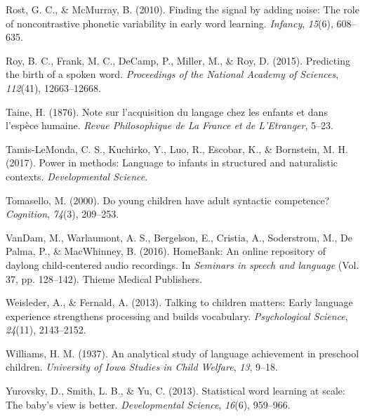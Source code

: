 \documentclass[floatsintext,man]{apa6}
\theoremstyle{definition}
\theoremstyle{definition}
\theoremstyle{definition}
\theoremstyle{remark}
\begin{document}
\leavevmode\hypertarget{ref-rost2010finding}{}%
Rost, G. C., \& McMurray, B. (2010). Finding the signal by adding noise:
The role of noncontrastive phonetic variability in early word learning.
\emph{Infancy}, \emph{15}(6), 608--635.

\leavevmode\hypertarget{ref-roy2015predicting}{}%
Roy, B. C., Frank, M. C., DeCamp, P., Miller, M., \& Roy, D. (2015).
Predicting the birth of a spoken word. \emph{Proceedings of the National
Academy of Sciences}, \emph{112}(41), 12663--12668.

\leavevmode\hypertarget{ref-taine1876note}{}%
Taine, H. (1876). Note sur l'acquisition du langage chez les enfants et
dans l'espèce humaine. \emph{Revue Philosophique de La France et de
L'Etranger}, 5--23.

\leavevmode\hypertarget{ref-tamis2017power}{}%
Tamis-LeMonda, C. S., Kuchirko, Y., Luo, R., Escobar, K., \& Bornstein,
M. H. (2017). Power in methods: Language to infants in structured and
naturalistic contexts. \emph{Developmental Science}.

\leavevmode\hypertarget{ref-tomasello2000young}{}%
Tomasello, M. (2000). Do young children have adult syntactic competence?
\emph{Cognition}, \emph{74}(3), 209--253.

\leavevmode\hypertarget{ref-vandam2016homebank}{}%
VanDam, M., Warlaumont, A. S., Bergelson, E., Cristia, A., Soderstrom,
M., De Palma, P., \& MacWhinney, B. (2016). HomeBank: An online
repository of daylong child-centered audio recordings. In \emph{Seminars
in speech and language} (Vol. 37, pp. 128--142). Thieme Medical
Publishers.

\leavevmode\hypertarget{ref-weisleder2013talking}{}%
Weisleder, A., \& Fernald, A. (2013). Talking to children matters: Early
language experience strengthens processing and builds vocabulary.
\emph{Psychological Science}, \emph{24}(11), 2143--2152.

\leavevmode\hypertarget{ref-williams1937analytical}{}%
Williams, H. M. (1937). An analytical study of language achievement in
preschool children. \emph{University of Iowa Studies in Child Welfare},
\emph{13}, 9--18.

\leavevmode\hypertarget{ref-yurovsky2013statistical}{}%
Yurovsky, D., Smith, L. B., \& Yu, C. (2013). Statistical word learning
at scale: The baby's view is better. \emph{Developmental Science},
\emph{16}(6), 959--966.
\end{document}

